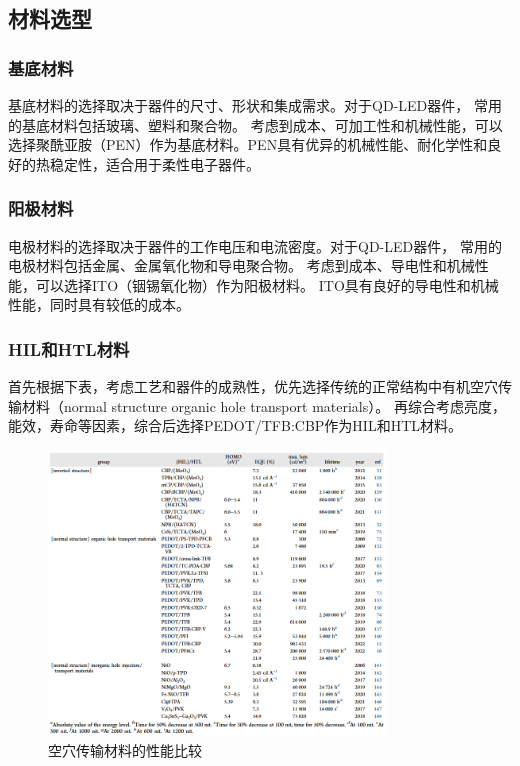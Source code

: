 \documentclass[12pt,hyperref,a4paper,UTF8]{ctexart}
\begin{document}
\subsection*{材料选型}

\subsubsection*{基底材料}
基底材料的选择取决于器件的尺寸、形状和集成需求。对于QD-LED器件，
常用的基底材料包括玻璃、塑料和聚合物。
考虑到成本、可加工性和机械性能，可以选择聚酰亚胺（PEN）作为基底材料。PEN具有优异的机械性能、耐化学性和良好的热稳定性，适合用于柔性电子器件。


\subsubsection*{阳极材料}
电极材料的选择取决于器件的工作电压和电流密度。对于QD-LED器件，
常用的电极材料包括金属、金属氧化物和导电聚合物。
考虑到成本、导电性和机械性能，可以选择ITO（铟锡氧化物）作为阳极材料。
ITO具有良好的导电性和机械性能，同时具有较低的成本。

\subsubsection*{HIL和HTL材料}


首先根据下表\cite{jang2023quantum}，考虑工艺和器件的成熟性，优先选择传统的正常结构中有机空穴传输材料（normal structure organic hole transport materials）。
再综合考虑亮度，能效，寿命等因素，综合后选择PEDOT/TFB:CBP作为HIL和HTL材料。
\begin{figure}[H]
  \centering
  \includegraphics[width=0.8\textwidth]{figures/fig/table1.png} 
  \caption{空穴传输材料的性能比较\cite{jang2023quantum}}
\end{figure}
\end{document}
